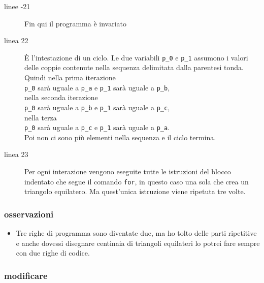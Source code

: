\begin{description}
 \item [linee -21] 
 Fin qui il programma è invariato
 \item [linea 22] 
 È l'intestazione di un ciclo. Le due variabili \lstinline{p_0} e 
\lstinline{p_1} assumono i valori delle coppie contenute nella sequenza 
delimitata dalla parentesi tonda. Quindi nella prima iterazione \\
\lstinline{p_0} sarà uguale a \lstinline{p_a} \quad e \quad
\lstinline{p_1} sarà uguale a \lstinline{p_b}, \\
nella seconda iterazione \\
\lstinline{p_0} sarà uguale a \lstinline{p_b} \quad e \quad
\lstinline{p_1} sarà uguale a \lstinline{p_c}, \\
nella terza \\
\lstinline{p_0} sarà uguale a \lstinline{p_c} \quad e \quad
\lstinline{p_1} sarà uguale a \lstinline{p_a}. \\
Poi non ci sono più elementi 
nella sequenza e il ciclo termina.
 \item [linea 23] 
 Per ogni interazione vengono eseguite tutte le istruzioni del blocco indentato 
che segue il comando \lstinline{for}, in questo caso una sola che crea un 
triangolo equilatero. Ma quest'unica istruzione viene ripetuta tre volte.
\end{description}

\subsubsection{osservazioni}

\begin{itemize} [noitemsep]
 \item Tre righe di programma sono diventate due, ma ho tolto delle parti 
ripetitive e anche dovessi disegnare centinaia di triangoli equilateri lo 
potrei fare sempre con due righe di codice.
\end{itemize}

\subsubsection{modificare}

